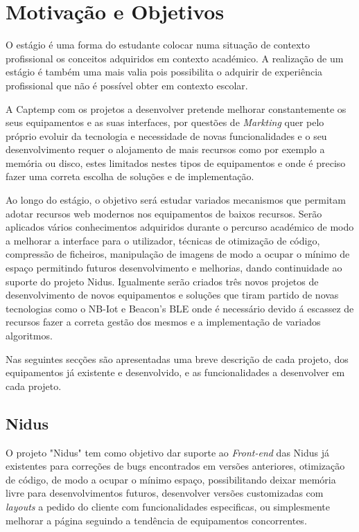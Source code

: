 \section{Motivação e Objetivos}
\par
O estágio é uma forma do estudante colocar numa situação de contexto profissional os conceitos adquiridos em contexto académico. A realização de um estágio é também uma mais valia pois possibilita o adquirir de experiência profissional que não é possível obter em contexto escolar.
\par
A Captemp com os projetos a desenvolver pretende melhorar constantemente os seus equipamentos e as suas interfaces, por questões de \textit{Markting} quer pelo próprio evoluir da tecnologia e necessidade de novas funcionalidades e o seu desenvolvimento requer o alojamento de mais recursos como por exemplo a memória ou disco, estes limitados nestes tipos de equipamentos e onde é preciso fazer uma correta escolha de soluções e de implementação. 
\par
Ao longo do estágio, o objetivo será estudar variados mecanismos que permitam adotar recursos web modernos nos equipamentos de baixos recursos. Serão aplicados vários conhecimentos adquiridos durante o percurso académico de modo a melhorar a interface para o utilizador, técnicas de otimização de código, compressão de ficheiros, manipulação de imagens de modo a ocupar o mínimo de espaço permitindo futuros desenvolvimento e melhorias, dando continuidade ao suporte do projeto Nidus. Igualmente serão criados três novos projetos de desenvolvimento de novos equipamentos e soluções que tiram partido de novas tecnologias como o NB-Iot e Beacon’s BLE onde é necessário devido á escassez de recursos fazer a correta gestão dos mesmos e a implementação de variados algoritmos.
\par
Nas seguintes secções são apresentadas uma breve descrição de cada projeto, dos equipamentos já existente e desenvolvido, e as funcionalidades a desenvolver em cada projeto.
\subsection{Nidus}
\par
O projeto "Nidus" tem como objetivo dar suporte ao \textit{Front-end} das Nidus já existentes para correções de bugs encontrados em versões anteriores, otimização de código, de modo a ocupar o mínimo espaço, possibilitando deixar memória livre para desenvolvimentos futuros, desenvolver versões customizadas com \textit{layouts} a pedido do cliente com funcionalidades especificas, ou simplesmente melhorar a página seguindo a tendência de equipamentos concorrentes.
